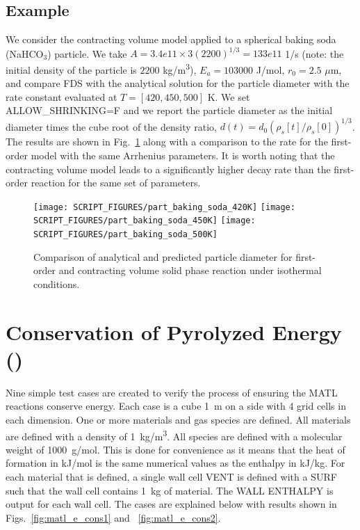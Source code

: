 \documentclass[11pt]{book}
\begin{document}
\subsection*{Example}

We consider the contracting volume model applied to a spherical baking soda (NaHCO$_3$) particle.  We take $A = 3.4e11 \times 3(2200)^{1/3} = 133e11$ 1/s (note: the initial density of the particle is $2200$ \si{kg/m^3}), $E_a = 103000$ J/mol, $r_0 = 2.5$ $\mu$m, and compare FDS with the analytical solution for the particle diameter with the rate constant evaluated at $T=[420, 450, 500]$ K.  We set {\ct ALLOW\_SHRINKING=F} and we report the particle diameter as the initial diameter times the cube root of the density ratio, $d(t) = d_0 (\rho_{s}[t]/\rho_s[0])^{1/3}$.  The results are shown in Fig.~\ref{fig:part_baking_soda} along with a comparison to the rate for the first-order model with the same Arrhenius parameters.  It is worth noting that the contracting volume model leads to a significantly higher decay rate than the first-order reaction for the same set of parameters.

\begin{figure}[!h]
\centering
\texttt{[image: SCRIPT\_FIGURES/part\_baking\_soda\_420K]}
\texttt{[image: SCRIPT\_FIGURES/part\_baking\_soda\_450K]}
\texttt{[image: SCRIPT\_FIGURES/part\_baking\_soda\_500K]}
\caption[The  test cases]{Comparison of analytical and predicted particle diameter for first-order and contracting volume solid phase reaction under isothermal conditions.}
\label{fig:part_baking_soda}
\end{figure}

\section{Conservation of Pyrolyzed Energy (\texorpdfstring{}{matl\_e\_cons})}
\label{matl_e_cons}

Nine simple test cases are created to verify the process of ensuring the {\ct MATL} reactions conserve energy. Each case is a cube 1~m on a side with 4 grid cells in each dimension. One or more materials and gas species are defined. All materials are defined with a density of 1~\si{kg/m^3}. All species are defined with a molecular weight of 1000~\si{g/mol}. This is done for convenience as it means that the heat of formation in \si{kJ/mol} is the same numerical values as the enthalpy in \si{kJ/kg}. For each material that is defined, a single wall cell {\ct VENT} is defined with a {\ct SURF} such that the wall cell contains 1~kg of material. The {\ct WALL ENTHALPY} is output for each wall cell. The cases are explained below with results shown in Figs.~\ref{fig:matl_e_cons1} and ~\ref{fig:matl_e_cons2}.
\end{document}
